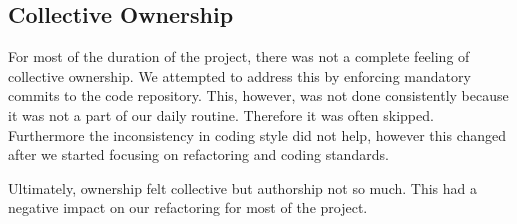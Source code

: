 \subsection{Collective Ownership}
For most of the duration of the project, there was not a complete feeling of collective ownership. We attempted to address this by enforcing mandatory commits to the code repository. This, however, was not done consistently because it was not a part of our daily routine. Therefore it was often skipped. Furthermore the inconsistency in coding style did not help, however this changed after we started focusing on refactoring and coding standards.

 Ultimately, ownership felt collective but authorship not so much. This had a negative impact on our refactoring for most of the project.